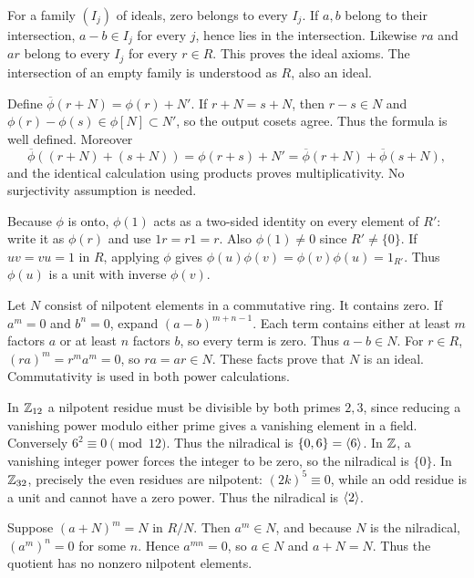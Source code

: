 For a family $(I_j)$ of ideals, zero belongs to every $I_j$. If $a,b$ belong to their intersection, $a-b\in I_j$ for every $j$, hence lies in the intersection. Likewise $ra$ and $ar$ belong to every $I_j$ for every $r\in R$. This proves the ideal axioms. The intersection of an empty family is understood as $R$, also an ideal.

Define $\overline\phi(r+N)=\phi(r)+N'$. If $r+N=s+N$, then $r-s\in N$ and $\phi(r)-\phi(s)\in\phi[N]\subset N'$, so the output cosets agree. Thus the formula is well defined. Moreover
\[\overline\phi((r+N)+(s+N))=\phi(r+s)+N'=\overline\phi(r+N)+\overline\phi(s+N),\]
and the identical calculation using products proves multiplicativity. No surjectivity assumption is needed.

Because $\phi$ is onto, $\phi(1)$ acts as a two-sided identity on every element of $R'$: write it as $\phi(r)$ and use $1r=r1=r$. Also $\phi(1)\ne0$ since $R'\ne\{0\}$. If $uv=vu=1$ in $R$, applying $\phi$ gives $\phi(u)\phi(v)=\phi(v)\phi(u)=1_{R'}$. Thus $\phi(u)$ is a unit with inverse $\phi(v)$.

Let $N$ consist of nilpotent elements in a commutative ring. It contains zero. If $a^m=0$ and $b^n=0$, expand $(a-b)^{m+n-1}$. Each term contains either at least $m$ factors $a$ or at least $n$ factors $b$, so every term is zero. Thus $a-b\in N$.
For $r\in R$, $(ra)^m=r^ma^m=0$, so $ra=ar\in N$. These facts prove that $N$ is an ideal. Commutativity is used in both power calculations.

In $\mathbb{Z}_{12}$ a nilpotent residue must be divisible by both primes $2,3$, since reducing a vanishing power modulo either prime gives a vanishing element in a field. Conversely $6^2\equiv0\pmod{12}$. Thus the nilradical is $\{0,6\}=\langle 6\rangle$.
In $\mathbb{Z}$, a vanishing integer power forces the integer to be zero, so the nilradical is $\{0\}$. In $\mathbb{Z}_{32}$, precisely the even residues are nilpotent: $(2k)^5\equiv0$, while an odd residue is a unit and cannot have a zero power. Thus the nilradical is $\langle 2\rangle$.

Suppose $(a+N)^m=N$ in $R/N$. Then $a^m\in N$, and because $N$ is the nilradical, $(a^m)^n=0$ for some $n$. Hence $a^{mn}=0$, so $a\in N$ and $a+N=N$. Thus the quotient has no nonzero nilpotent elements.

